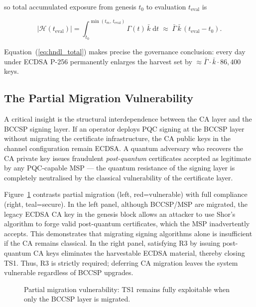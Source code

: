 \documentclass[conference]{IEEEtran}
\begin{document}
so total accumulated exposure from genesis $t_0$ to evaluation
$t_{\mathrm{eval}}$ is

\begin{equation}
|\mathcal{H}(t_{\mathrm{eval}})| =
\int_{t_0}^{\min(t_m,\,t_{\mathrm{eval}})} \Gamma(t)\,\bar{k}\;\mathrm{d}t
\;\approx\; \bar{\Gamma}\,\bar{k}\,(t_{\mathrm{eval}} - t_0).
\label{eq:hndl_total}
\end{equation}

Equation~(\ref{eq:hndl_total}) makes precise the governance conclusion: every day
under ECDSA P-256 permanently enlarges the harvest set by
$\approx \bar{\Gamma}\cdot\bar{k}\cdot 86{,}400$ keys.

\subsection{The Partial Migration Vulnerability}
\label{sec:tm_partial}

A critical insight is the structural interdependence between the CA layer and
the BCCSP signing layer. If an operator deploys PQC signing at the BCCSP layer
without migrating the certificate infrastructure, the CA public keys in the
channel configuration remain ECDSA. A quantum adversary who recovers the CA
private key issues fraudulent \emph{post-quantum} certificates accepted as
legitimate by any PQC-capable MSP --- the quantum resistance of the signing
layer is completely neutralised by the classical vulnerability of the
certificate layer.

Figure~\ref{fig:partial_migration} contrasts partial migration (left, red=vulnerable) with full compliance (right, teal=secure). In the left panel, although BCCSP/MSP are migrated, the legacy ECDSA CA key in the genesis block allows an attacker to use Shor’s algorithm to forge valid post-quantum certificates, which the MSP inadvertently accepts. This demonstrates that migrating signing algorithms alone is insufficient if the CA remains classical. In the right panel, satisfying R3 by issuing post-quantum CA keys eliminates the harvestable ECDSA material, thereby closing TS1. Thus, R3 is strictly required; deferring CA migration leaves the system vulnerable regardless of BCCSP upgrades.

\begin{figure}[tbp]
\centering

\caption{Partial migration vulnerability: TS1 remains fully exploitable when only the BCCSP layer is migrated.}
\label{fig:partial_migration}
\end{figure}
\end{document}
